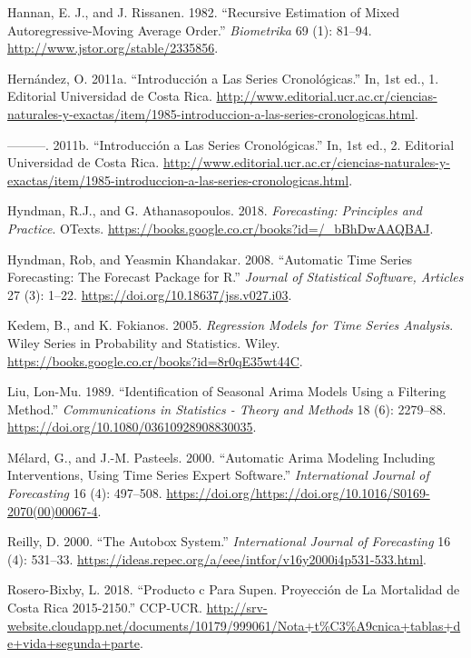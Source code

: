 \documentclass[12pt]{article}
\begin{document}
\leavevmode\hypertarget{ref-hannan}{}%
Hannan, E. J., and J. Rissanen. 1982. ``Recursive Estimation of Mixed
Autoregressive-Moving Average Order.'' \emph{Biometrika} 69 (1): 81--94.
\url{http://www.jstor.org/stable/2335856}.

\leavevmode\hypertarget{ref-oscarh-1}{}%
Hernández, O. 2011a. ``Introducción a Las Series Cronológicas.'' In, 1st
ed., 1. Editorial Universidad de Costa Rica.
\url{http://www.editorial.ucr.ac.cr/ciencias-naturales-y-exactas/item/1985-introduccion-a-las-series-cronologicas.html}.

\leavevmode\hypertarget{ref-oscarh-2}{}%
---------. 2011b. ``Introducción a Las Series Cronológicas.'' In, 1st
ed., 2. Editorial Universidad de Costa Rica.
\url{http://www.editorial.ucr.ac.cr/ciencias-naturales-y-exactas/item/1985-introduccion-a-las-series-cronologicas.html}.

\leavevmode\hypertarget{ref-hyndman2018forecasting}{}%
Hyndman, R.J., and G. Athanasopoulos. 2018. \emph{Forecasting:
Principles and Practice}. OTexts.
\url{https://books.google.co.cr/books?id=/_bBhDwAAQBAJ}.

\leavevmode\hypertarget{ref-auto.arima}{}%
Hyndman, Rob, and Yeasmin Khandakar. 2008. ``Automatic Time Series
Forecasting: The Forecast Package for R.'' \emph{Journal of Statistical
Software, Articles} 27 (3): 1--22.
\url{https://doi.org/10.18637/jss.v027.i03}.

\leavevmode\hypertarget{ref-kedem}{}%
Kedem, B., and K. Fokianos. 2005. \emph{Regression Models for Time
Series Analysis}. Wiley Series in Probability and Statistics. Wiley.
\url{https://books.google.co.cr/books?id=8r0qE35wt44C}.

\leavevmode\hypertarget{ref-liu}{}%
Liu, Lon-Mu. 1989. ``Identification of Seasonal Arima Models Using a
Filtering Method.'' \emph{Communications in Statistics - Theory and
Methods} 18 (6): 2279--88.
\url{https://doi.org/10.1080/03610928908830035}.

\leavevmode\hypertarget{ref-melard}{}%
Mélard, G., and J.-M. Pasteels. 2000. ``Automatic Arima Modeling
Including Interventions, Using Time Series Expert Software.''
\emph{International Journal of Forecasting} 16 (4): 497--508.
\url{https://doi.org/https://doi.org/10.1016/S0169-2070(00)00067-4}.

\leavevmode\hypertarget{ref-autobox}{}%
Reilly, D. 2000. ``The Autobox System.'' \emph{International Journal of
Forecasting} 16 (4): 531--33.
\url{https://ideas.repec.org/a/eee/intfor/v16y2000i4p531-533.html}.

\leavevmode\hypertarget{ref-supenprodc}{}%
Rosero-Bixby, L. 2018. ``Producto c Para Supen. Proyección de La
Mortalidad de Costa Rica 2015-2150.'' CCP-UCR.
\url{http://srv-website.cloudapp.net/documents/10179/999061/Nota+t\%C3\%A9cnica+tablas+de+vida+segunda+parte}.
\end{document}
